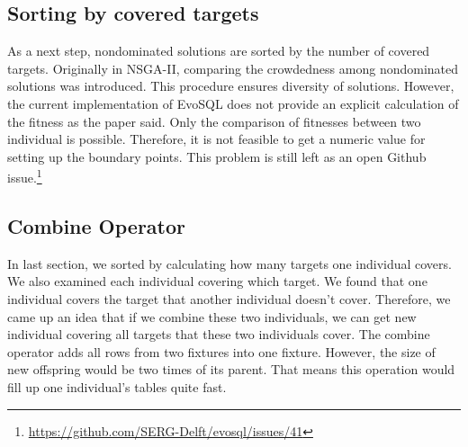 \subsection{Sorting by covered targets}
As a next step, nondominated solutions are sorted by the number of covered targets. Originally in NSGA-II, comparing the crowdedness among nondominated solutions was introduced. This procedure ensures diversity of solutions. However, the current implementation of EvoSQL does not provide an explicit calculation of the fitness as the paper said. Only the comparison of fitnesses between two individual is possible. Therefore, it is not feasible to get a numeric value for setting up the boundary points. This problem is still left as an open Github issue.\footnote[1]{\href{https://github.com/SERG-Delft/evosql/issues/41}{https://github.com/SERG-Delft/evosql/issues/41}}

\subsection{Combine Operator}

In last section, we sorted by calculating how many targets one individual covers. We also examined each individual covering which target. We found that one individual covers the target that another individual doesn’t cover. Therefore, we came up an idea that if we combine these two individuals, we can get new individual covering all targets that these two individuals cover. The combine operator adds all rows from two fixtures into one fixture. However, the size of new offspring would be two times of its parent. That means this operation would fill up one individual’s tables quite fast.

